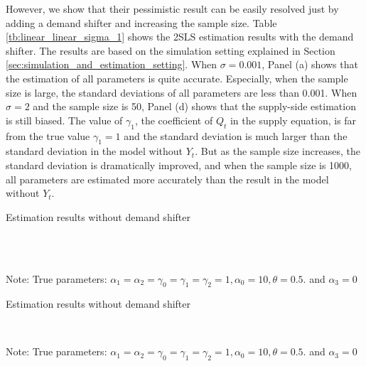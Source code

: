 \documentclass[11pt, a4paper]{article}
\begin{document}
However, we show that their pessimistic result can be easily resolved just by adding a demand shifter and increasing the sample size.
Table \ref{tb:linear_linear_sigma_1} shows the 2SLS estimation results with the demand shifter.
The results are based on the simulation setting explained in Section \ref{sec:simulation_and_estimation_setting}.
When $\sigma = 0.001$, Panel (a) shows that the estimation of all parameters is quite accurate.
Especially, when the sample size is large, the standard deviations of all parameters are less than 0.001.
When $\sigma = 2$ and the sample size is 50, Panel (d) shows that the supply-side estimation is still biased.
The value of $\gamma_1$, the coefficient of $Q_t$ in the supply equation, is far from the true value $\gamma_1 = 1$ and the standard deviation is much larger than the standard deviation in the model without $Y_t$.
But as the sample size increases, the standard deviation is dramatically improved, and when the sample size is 1000, all parameters are estimated more accurately than the result in the model without $Y_t$.

\begin{table}[!htbp]
  \begin{center}
      \caption{Estimation results without demand shifter}
      \label{tb:linear_linear_sigma_1_without_demand_shifter_y} 
      \subfloat[$\sigma=0.001$]{}\\
      \subfloat[$\sigma=0.5$]{}\\
  \end{center}\footnotesize
  Note: True parameters: $\alpha_1 = \alpha_2 =  \gamma_0 = \gamma_1 = \gamma_2  =  1, \alpha_0 = 10, \theta = 0.5.$ and $\alpha_3 =0$
\end{table} 

\begin{table}[!htbp]
  \ContinuedFloat  %
  \begin{center}
      \caption{Estimation results without demand shifter}
      \label{tb:linear_linear_sigma_1_without_demand_shifter_y} 
      \subfloat[$\sigma=1.0$]{}\\
    \subfloat[$\sigma=2.0$]{}
  \end{center}\footnotesize
  Note: True parameters: $\alpha_1 = \alpha_2 =  \gamma_0 = \gamma_1 = \gamma_2  =  1, \alpha_0 = 10, \theta = 0.5.$ and $\alpha_3 =0$
\end{table} 
\end{document}
